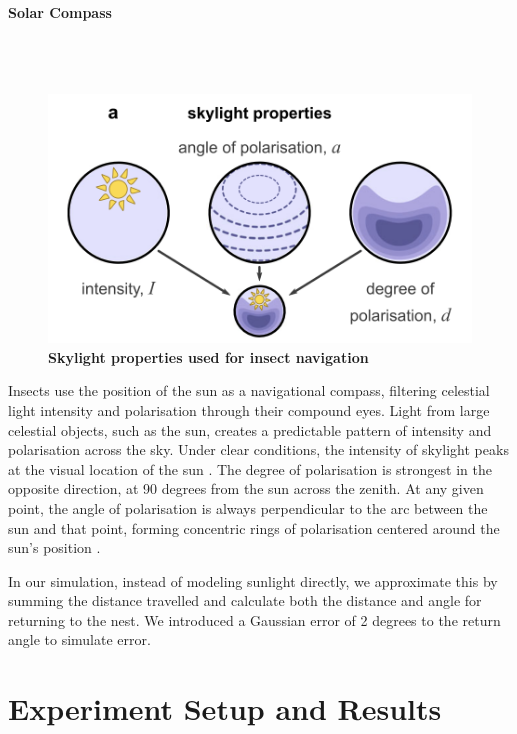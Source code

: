 \documentclass[12pt,a4paper]{article}
\begin{document}
\paragraph{Solar Compass}\\~\\
\begin{figure}
    \begin{center}
    \includegraphics[width=.8\linewidth]{skylight_prop.png}
    \end{center}
    \captionsetup{justification=centering,margin=0cm}
    \caption{\textbf{Skylight properties used for insect navigation} \cite{gkanias_mitchell_stankiewicz_khan_mitra_webb_2023}}
    \label{mb_model}
\end{figure}
Insects use the position of the sun as a navigational compass, filtering celestial light intensity and polarisation through their compound eyes. Light from large celestial objects, such as the sun, creates a predictable pattern of intensity and polarisation across the sky. Under clear conditions, the intensity of skylight peaks at the visual location of the sun \cite{wehner_2008}. The degree of polarisation is strongest in the opposite direction, at 90 degrees from the sun across the zenith. At any given point, the angle of polarisation is always perpendicular to the arc between the sun and that point, forming concentric rings of polarisation centered around the sun's position \cite{gkanias_mitchell_stankiewicz_khan_mitra_webb_2023}.

In our simulation, instead of modeling sunlight directly, we approximate this by summing the distance travelled and calculate both the distance and angle for returning to the nest. We introduced a Gaussian error of 2 degrees to the return angle to simulate error.


\section{Experiment Setup and Results}
\end{document}
